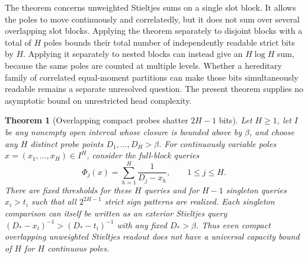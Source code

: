 \documentclass[11pt]{article}
\newtheorem{theorem}{Theorem}
\begin{document}
The theorem concerns unweighted Stieltjes sums on a single slot block.
It allows the poles to move continuously and correlatedly, but it does
not sum over several overlapping slot blocks. Applying the theorem
separately to disjoint blocks with a total of $H$ poles bounds their
total number of independently readable strict bits by $H$. Applying
it separately to nested blocks can instead give an $H\log H$ sum,
because the same poles are counted at multiple levels. Whether a
hereditary family of correlated equal-moment partitions can make those
bits simultaneously readable remains a separate unresolved question.
The present theorem supplies no asymptotic bound on unrestricted head
complexity.

\begin{theorem}[Overlapping compact probes shatter $2H-1$ bits]
Let $H\geq1$, let $I$ be any nonempty open interval whose closure is
bounded above by $\beta$, and choose any $H$ distinct probe points
$D_1,\ldots,D_H>\beta$. For continuously variable poles
$x=(x_1,\ldots,x_H)\in I^H$, consider the full-block queries
\[
 \Phi_j(x)=\sum_{h=1}^H\frac1{D_j-x_h},\qquad 1\leq j\leq H.
\]
There are fixed thresholds for these $H$ queries and for $H-1$
singleton queries $x_i>t_i$ such that all $2^{2H-1}$ strict sign
patterns are realized. Each singleton comparison can itself be
written as an exterior Stieltjes query
$(D_*-x_i)^{-1}>(D_*-t_i)^{-1}$ with any fixed $D_*>\beta$.
Thus even compact overlapping unweighted Stieltjes readout does not
have a universal capacity bound of $H$ for $H$ continuous poles.
\end{theorem}
\end{document}
